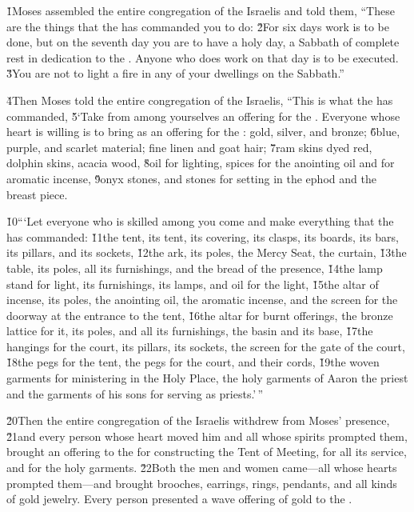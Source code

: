 \v{1}Moses assembled the entire congregation of the Israelis and told them, ``These are the things that the  has commanded you to do: \v{2}For six days work is to be done, but on the seventh day you are to have a holy day, a Sabbath of complete rest in dedication to the . Anyone who does work on that day is to be executed. \v{3}You are not to light a fire in any of your dwellings on the Sabbath.''

\v{4}Then Moses told the entire congregation of the Israelis, ``This is what the  has commanded, \v{5}`Take from among yourselves an offering for the . Everyone whose heart is willing is to bring as an offering for the : gold, silver, and bronze; \v{6}blue, purple, and scarlet material; fine linen and goat hair; \v{7}ram skins dyed red, dolphin skins, acacia wood, \v{8}oil for lighting, spices for the anointing oil and for aromatic incense, \v{9}onyx stones, and stones for setting in the ephod and the breast piece.

\v{10}```Let everyone who is skilled among you come and make everything that the  has commanded: \v{11}the tent, its tent, its covering, its clasps, its boards, its bars, its pillars, and its sockets, \v{12}the ark, its poles, the Mercy Seat, the curtain, \v{13}the table, its poles, all its furnishings, and the bread of the presence, \v{14}the lamp stand for light, its furnishings, its lamps, and oil for the light, \v{15}the altar of incense, its poles, the anointing oil, the aromatic incense, and the screen for the doorway at the entrance to the tent, \v{16}the altar for burnt offerings, the bronze lattice for it, its poles, and all its furnishings, the basin and its base, \v{17}the hangings for the court, its pillars, its sockets, the screen for the gate of the court, \v{18}the pegs for the tent, the pegs for the court, and their cords, \v{19}the woven garments for ministering in the Holy Place, the holy garments of Aaron the priest and the garments of his sons for serving as priests.'\,''

\v{20}Then the entire congregation of the Israelis withdrew from Moses' presence, \v{21}and every person whose heart moved him and all whose spirits prompted them, brought an offering to the  for constructing the Tent of Meeting, for all its service, and for the holy garments. \v{22}Both the men and women came---all whose hearts prompted them---and brought brooches, earrings, rings, pendants, and all kinds of gold jewelry. Every person presented a wave offering of gold to the .

